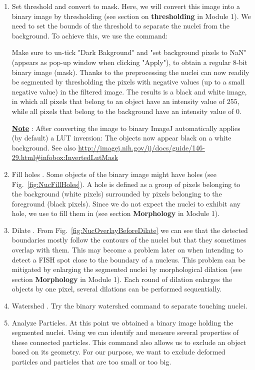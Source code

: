 \begin{enumerate}
\item Set threshold and convert to mask. 
    Here, we will convert this image into a binary image by thresholding (see section on \textbf{thresholding} in Module 1). We need to set the bounds of the threshold to separate the nuclei from the background. To achieve this, we use the command:
   
    
    Make sure to un-tick "Dark Bakground" and "set background pixels to NaN" (appears as pop-up window when clicking "Apply"), to obtain a regular 8-bit binary image (mask). Thanks to the preprocessing the nuclei can now readily be segmented by thresholding the pixels with negative values (up to a small negative value) in the filtered image. 
    The results is a black and white image, in which all pixels that belong to an object have an intensity value of 255, while all pixels that belong to the background have an intensity value of 0. 
    
    \textbf{\underline{Note}} : After converting the image to binary ImageJ automatically applies (by default) a LUT inversion: The objects now appear black on a white background. See also  \url{http://imagej.nih.gov/ij/docs/guide/146-29.html#infobox:InvertedLutMask}

\item Fill holes
    .
    Some objects of the binary image might have holes (see Fig.~\ref{fig:NucFillHoles}). A hole is defined as a group of pixels belonging to the background (white pixels) surrounded by pixels belonging to the foreground (black pixels). Since we do not expect the nuclei to exhibit any hole, we use  to fill them in (see section \textbf{Morphology} in Module 1).  
\item Dilate
    .
    From Fig.~\ref{fig:NucOverlayBeforeDilate} we can see that the detected boundaries mostly follow the contours of the nuclei but that they sometimes overlap with them. This may become a problem later on when intending to detect a FISH spot close to the boundary of a nucleus. This problem can be mitigated by enlarging the segmented nuclei by morphological dilation (see section \textbf{Morphology} in Module 1). Each round of dilation enlarges the objects by one pixel, several dilations can be performed sequentially. 
\item Watershed
    .
    Try the binary watershed command to separate touching nuclei.
\item Analyze Particles.
    At this point we obtained a binary image holding the segmented nuclei.
    Using  we can identify and measure several properties of these connected particles. This command also allows us to exclude an object based on its geometry. For our purpose,  we want to exclude deformed particles and particles that are too small or too big.
    

\end{enumerate}
